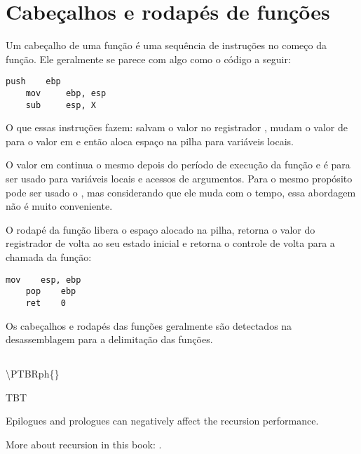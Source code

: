 \section{Cabeçalhos e rodapés de funções}
\label{sec:prologepilog}
\myindex{\PTBRph{}} %
\myindex{\PTBRph{}} %

Um cabeçalho de uma função é uma sequência de instruções no começo da função. Ele geralmente se parece com algo como o código a seguir:

\begin{lstlisting}[style=customasmx86]
    push    ebp
    mov     ebp, esp
    sub     esp, X
\end{lstlisting}

O que essas instruções fazem: salvam o valor no registrador \EBP, mudam o valor de \EBP para o valor em \ESP e então aloca espaço na pilha para variáveis locais.

O valor em \EBP continua o mesmo depois do período de execução da função e é para ser usado para variáveis locais e acessos de argumentos.
Para o mesmo propósito pode ser usado o \ESP, mas considerando que ele muda com o tempo, essa abordagem não é muito conveniente.

O rodapé da função libera o espaço alocado na pilha, retorna o valor do registrador \EBP de volta ao seu estado inicial e retorna o controle de volta para a chamada da função:

\begin{lstlisting}[style=customasmx86]
    mov    esp, ebp
    pop    ebp
    ret    0
\end{lstlisting}

Os cabeçalhos e rodapés das funções geralmente são detectados na desassemblagem para a delimitação das funções.

\subsection{\Recursion}

\ac{\PTBRph{}}

\myindex{\Recursion}
\ac{TBT}

Epilogues and prologues can negatively affect the recursion performance.

More about recursion in this book: .

